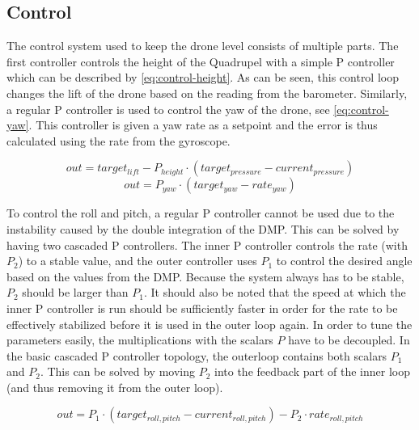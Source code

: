 \documentclass[final]{article}
\begin{document}
\subsection{Control}
The control system used to keep the drone level consists of multiple parts.
The first controller controls the height of the Quadrupel with a simple P controller which can be described by \autoref{eq:control-height}.
As can be seen, this control loop changes the lift of the drone based on the reading from the barometer.
Similarly, a regular P controller is used to control the yaw of the drone, see \autoref{eq:control-yaw}.
This controller is given a yaw rate as a setpoint and the error is thus calculated using the rate from the gyroscope.

\begin{equation}
out = target_{lift} - P_{height} \cdot (target_{pressure} - current_{pressure})
\label{eq:control-height}
\end{equation}
\begin{equation}
out = P_{yaw} \cdot (target_{yaw} - rate_{yaw})
\label{eq:control-yaw}
\end{equation}

To control the roll and pitch, a regular P controller cannot be used due to the instability caused by the double integration of the DMP.
This can be solved by having two cascaded P controllers.
The inner P controller controls the rate (with $P_2$) to a stable value, and the outer controller uses $P_1$ to control the desired angle based on the values from the DMP.
Because the system always has to be stable, $P_2$ should be larger than $P_1$.
It should also be noted that the speed at which the inner P controller is run should be sufficiently faster in order for the rate to be effectively stabilized before it is used in the outer loop again.
In order to tune the parameters easily, the multiplications with the scalars $P$ have to be decoupled.
In the basic cascaded P controller topology, the outerloop contains both scalars $P_1$ and $P_2$.
This can be solved by moving $P_2$ into the feedback part of the inner loop (and thus removing it from the outer loop).

\begin{equation}
out = P_1 \cdot (target_{roll,pitch} - current_{roll,pitch}) - P_2 \cdot rate_{roll,pitch}
\label{eq:control-roll-pitch}
\end{equation}
\end{document}
